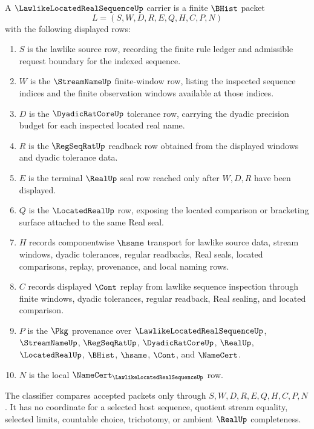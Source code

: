 \begin{definition}
\label{def:lawlike-located-real-sequence-carrier}
A $\LawlikeLocatedRealSequenceUp$ carrier is a finite $\BHist$ packet
$$
L=(S,W,D,R,E,Q,H,C,P,N)
$$
with the following displayed rows:
\begin{enumerate}
\item $S$ is the lawlike source row, recording the finite rule ledger and admissible request boundary for the indexed sequence.
\item $W$ is the $\StreamNameUp$ finite-window row, listing the inspected sequence indices and the finite observation windows available at those indices.
\item $D$ is the $\DyadicRatCoreUp$ tolerance row, carrying the dyadic precision budget for each inspected located real name.
\item $R$ is the $\RegSeqRatUp$ readback row obtained from the displayed windows and dyadic tolerance data.
\item $E$ is the terminal $\RealUp$ seal row reached only after $W,D,R$ have been displayed.
\item $Q$ is the $\LocatedRealUp$ row, exposing the located comparison or bracketing surface attached to the same Real seal.
\item $H$ records componentwise $\hsame$ transport for lawlike source data, stream windows, dyadic tolerances, regular readbacks, Real seals, located comparisons, replay, provenance, and local naming rows.
\item $C$ records displayed $\Cont$ replay from lawlike sequence inspection through finite windows, dyadic tolerances, regular readback, Real sealing, and located comparison.
\item $P$ is the $\Pkg$ provenance over $\LawlikeLocatedRealSequenceUp$, $\StreamNameUp$, $\RegSeqRatUp$, $\DyadicRatCoreUp$, $\RealUp$, $\LocatedRealUp$, $\BHist$, $\hsame$, $\Cont$, and $\NameCert$.
\item $N$ is the local $\NameCert_{\LawlikeLocatedRealSequenceUp}$ row.
\end{enumerate}
The classifier compares accepted packets only through $S,W,D,R,E,Q,H,C,P,N$. It has no coordinate for a selected host sequence, quotient stream equality, selected limits, countable choice, trichotomy, or ambient $\RealUp$ completeness.
\end{definition}

